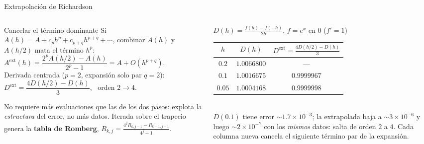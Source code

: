 \documentclass[aspectratio=169,10pt]{beamer}
\begin{document}
\begin{frame}{Extrapolación de Richardson}
\begin{columns}[T]
\begin{column}{0.47\textwidth}
\begin{cardidea}{Cancelar el término dominante}{\faSuperscript}
{\footnotesize Si $A(h)=A+c_p h^p+c_{p+q}h^{p+q}+\cdots$, combinar $A(h)$ y $A(h/2)$ mata el término $h^p$:\\[0.8mm]
$A^{\text{ext}}(h)=\dfrac{2^p A(h/2)-A(h)}{2^p-1}=A+O(h^{p+q})$.\\[1.2mm]
Derivada centrada ($p{=}2$, expansión solo par $q{=}2$):\\[0.4mm]
$D^{\text{ext}}=\dfrac{4D(h/2)-D(h)}{3}$, \ orden $2\to4$.}
\end{cardidea}
\vspace{1mm}
\begin{cardnota}[\faInfoCircle]
{\footnotesize No requiere más evaluaciones que las de los dos pasos: explota la \emph{estructura} del error, no más datos. Iterada sobre el trapecio genera la \textbf{tabla de Romberg}, $R_{k,j}=\tfrac{4^jR_{k,j-1}-R_{k-1,j-1}}{4^j-1}$.}
\end{cardnota}
\end{column}
\begin{column}{0.51\textwidth}
\begin{cardgear}{$D(h)=\frac{f(h)-f(-h)}{2h}$, $f=e^x$ en $0$ ($f'=1$)}{\faTable}
\centering
{\footnotesize\renewcommand{\arraystretch}{1.32}\setlength{\tabcolsep}{6pt}
\begin{tabular}{c|c|c}
$h$ & $D(h)$ & $D^{\text{ext}}=\frac{4D(h/2)-D(h)}{3}$\\\hline
$0.2$ & $1.0066800$ & —\\
$0.1$ & $1.0016675$ & $0.9999967$\\
$0.05$ & $1.0004168$ & $0.9999998$\\
\end{tabular}}\\[1.4mm]
{\footnotesize $D(0.1)$ tiene error $\sim1.7{\times}10^{-3}$; la extrapolada baja a $\sim3{\times}10^{-6}$ y luego $\sim2{\times}10^{-7}$ con los \emph{mismos} datos: salta de orden $2$ a $4$. Cada columna nueva cancela el siguiente término par de la expansión.}
\end{cardgear}
\end{column}
\end{columns}
\end{frame}
\end{document}
